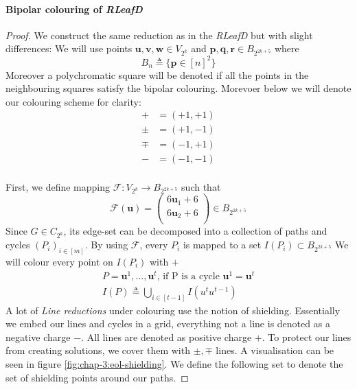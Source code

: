 \paragraph*{Bipolar colouring of \textit{RLeafD}}

\begin{proof}
    We construct the same reduction as in the \textit{RLeafD} but with slight differences:
    We will use points $\mathbf{u}, \mathbf{v}, \mathbf{w} \in V_{2^k}$ and $\mathbf{p},\mathbf{q}, \mathbf{r} \in B_{2^{2k+5}}$ where
    $$
        B_n \triangleq \big\{  \mathbf{p} \in [n]^2 \big\}
    $$
    Moreover a polychromatic square will be denoted if all the points in the neighbouring squares satisfy the bipolar colouring.
    Morevoer below we will denote our colouring scheme for clarity:
    \begin{align*}
        +   & = (+1, +1) \\
        \pm & = (+1, -1) \\
        \mp & = (-1, +1) \\
        -   & = (-1, -1) \\
    \end{align*}


    First, we define mapping $\mathcal{F}: V_{2^k} \to B_{2^{2k+5}}$ such that
    $$
        \mathcal{F}(\mathbf{u}) = \begin{pmatrix}
            6 \mathbf{u}_{1} + 6 \\
            6 \mathbf{u}_{2} + 6 \\
        \end{pmatrix} \in B_{2^{2k+5}}
    $$
    Since $G \in C_{2^k}$, its edge-set can be decomposed into a collection of paths and cycles $(P_{i})_{i \in [m]}$.
    By using $\mathcal{F}$, every $P_{i}$ is mapped to a set $I(P_{i}) \subset B_{2^{2k+5}}$
    We will colour every point  on $I(P_{i})$ with $+$
    \begin{gather}
        P = \mathbf{u}^1,\dots,\mathbf{u}^t \text{, if P is a cycle } \mathbf{u}^1 = \mathbf{u}^t \\
        I(P) \triangleq \bigcup_{i \in [t-1]} I(u^tu^{t-1})
    \end{gather}
    A lot of \textit{Line reductions} under colouring use the notion of shielding. %
    Essentially we embed our lines and cycles in a grid, everything not a line is denoted as a negative charge $-$.
    All lines are denoted as positive charge $+$. To protect our lines from creating solutions, we cover them
    with $\pm, \mp$ lines. A visualisation can be seen in figure \ref{fig:chap-3:eol-shielding}.
    We define the following set to denote the set of shielding points around our paths.


\end{proof}
